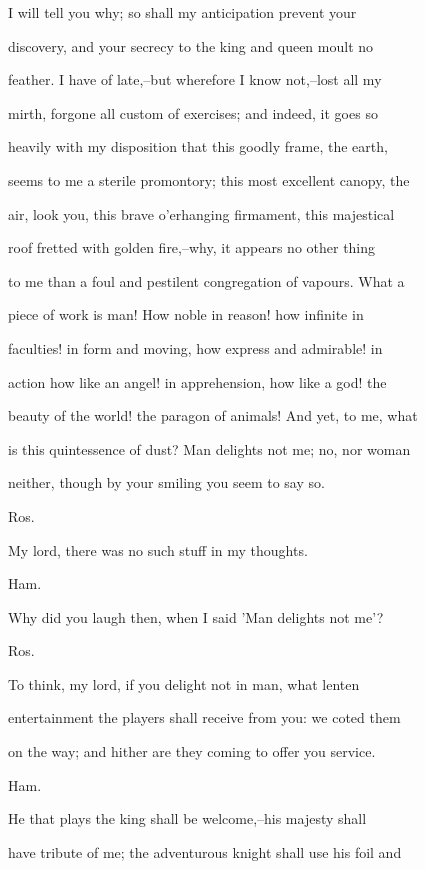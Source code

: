 \documentclass[12pt]{book}
\begin{document}
I will tell you why; so shall my anticipation prevent your

discovery, and your secrecy to the king and queen moult no

feather. I have of late,--but wherefore I know not,--lost all my

mirth, forgone all custom of exercises; and indeed, it goes so

heavily with my disposition that this goodly frame, the earth,

seems to me a sterile promontory; this most excellent canopy, the

air, look you, this brave o'erhanging firmament, this majestical

roof fretted with golden fire,--why, it appears no other thing

to me than a foul and pestilent congregation of vapours. What a

piece of work is man! How noble in reason! how infinite in

faculties! in form and moving, how express and admirable! in

action how like an angel! in apprehension, how like a god! the

beauty of the world! the paragon of animals! And yet, to me, what

is this quintessence of dust? Man delights not me; no, nor woman

neither, though by your smiling you seem to say so.



Ros.

My lord, there was no such stuff in my thoughts.



Ham.

Why did you laugh then, when I said 'Man delights not me'?



Ros.

To think, my lord, if you delight not in man, what lenten

entertainment the players shall receive from you: we coted them

on the way; and hither are they coming to offer you service.



Ham.

He that plays the king shall be welcome,--his majesty shall

have tribute of me; the adventurous knight shall use his foil and
\end{document}
